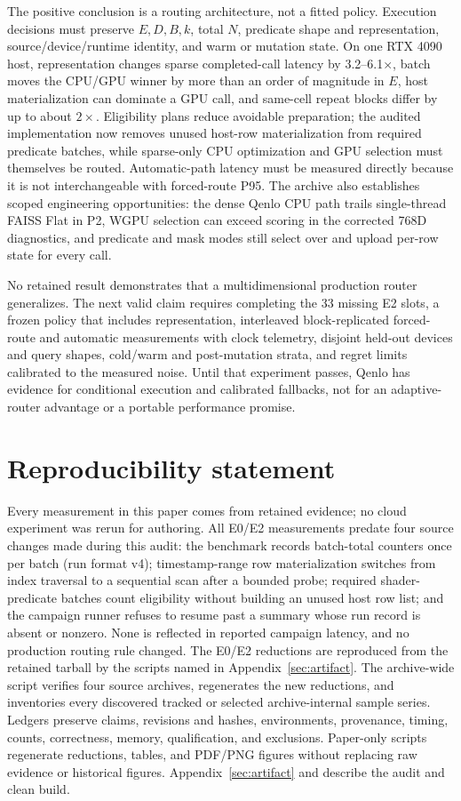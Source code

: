 \documentclass[10pt]{article}
\begin{document}
The positive conclusion is a routing architecture, not a fitted policy. Execution decisions must preserve $E,D,B,k$, total $N$, predicate shape and representation, source/device/runtime identity, and warm or mutation state. On one RTX 4090 host, representation changes sparse completed-call latency by 3.2--6.1$\times$, batch moves the CPU/GPU winner by more than an order of magnitude in $E$, host materialization can dominate a GPU call, and same-cell repeat blocks differ by up to about $2\times$. Eligibility plans reduce avoidable preparation; the audited implementation now removes unused host-row materialization from required predicate batches, while sparse-only CPU optimization and GPU selection must themselves be routed. Automatic-path latency must be measured directly because it is not interchangeable with forced-route P95. The archive also establishes scoped engineering opportunities: the dense Qenlo CPU path trails single-thread FAISS Flat in P2, WGPU selection can exceed scoring in the corrected 768D diagnostics, and predicate and mask modes still select over and upload per-row state for every call.

No retained result demonstrates that a multidimensional production router generalizes. The next valid claim requires completing the 33 missing E2 slots, a frozen policy that includes representation, interleaved block-replicated forced-route and automatic measurements with clock telemetry, disjoint held-out devices and query shapes, cold/warm and post-mutation strata, and regret limits calibrated to the measured noise. Until that experiment passes, Qenlo has evidence for conditional execution and calibrated fallbacks, not for an adaptive-router advantage or a portable performance promise.

\section*{Reproducibility statement}
Every measurement in this paper comes from retained evidence; no cloud experiment was rerun for authoring. All E0/E2 measurements predate four source changes made during this audit: the benchmark records batch-total counters once per batch (run format v4); timestamp-range row materialization switches from index traversal to a sequential scan after a bounded probe; required shader-predicate batches count eligibility without building an unused host row list; and the campaign runner refuses to resume past a summary whose run record is absent or nonzero. None is reflected in reported campaign latency, and no production routing rule changed. The E0/E2 reductions are reproduced from the retained tarball by the scripts named in Appendix~\ref{sec:artifact}. The archive-wide script verifies four source archives, regenerates the new reductions, and inventories every discovered tracked or selected archive-internal sample series. Ledgers preserve claims, revisions and hashes, environments, provenance, timing, counts, correctness, memory, qualification, and exclusions. Paper-only scripts regenerate reductions, tables, and PDF/PNG figures without replacing raw evidence or historical figures. Appendix~\ref{sec:artifact} and  describe the audit and clean build.


\clearpage
\appendix

\end{document}
